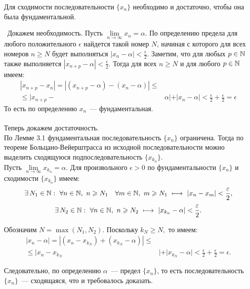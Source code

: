 \begin{theorem}
Для сходимости последовательности \(\{x_{n}\}\) необходимо и достаточно,
чтобы она была фундаментальной.

\vspace{3mm}

\proofname~Докажем необходимость.
Пусть \(\lim\limits_{n \to \infty} {x_{n}} = \alpha.\) По определению предела
для любого положительного \(\epsilon\) найдется такой номер \(N\), начиная с которого
 для всех номеров \(n \geq N\) будет выполняться \(|x_{n}-\alpha|<\frac{\epsilon}{2}.\)
Заметим, что для любых \(p \in \mathbb{N}\) также выполняется \(|x_{n+p} - \alpha| < \frac{\epsilon}{2}\).
Тогда для всех \(n \geq N\) и для любого \(p \in \mathbb{N}\) имеем:
\[
\begin{aligned}
|x_{n+p} - x_{n}| = |(x_{n+p} - \alpha) - (x_{n} - \alpha)| \leq \\
\leq |x_{n+p} - & \alpha| + |x_{n} - \alpha| < \frac{\epsilon}{2} + \frac{\epsilon}{2} = \epsilon
\end{aligned}
\]
То есть по определению \(x_{n}\)~--- фундаментальная. \\
\\

Теперь докажем достаточность.\\
\indent По Лемме 3.1 фундаментальная последовательность \(\{x_{n}\}\) ограничена. 
Тогда по теореме Больцано-Вейерштрасса из исходной последовательности
можно выделить сходящуюся подпоследовательность \(\{x_{k_{n}}\}\). \\

\indent Пусть \(\lim\limits_{n \to \infty} {x_{k_{n}}} = \alpha.\) 
Для произвольного \(\epsilon > 0\) по фундаментальности \(\{x_{n}\}\) 
и сходимости \(\{x_{k_{n}}\}\) имеем:
\[
\exists \, N_{1} \in \mathbb{N} : ~ \forall n \in \mathbb{N}, ~ n \geqslant N_{1} \hspace{1em}
\forall m \in \mathbb{N}, ~ m \geqslant N_{1} ~ \longmapsto ~ |x_{n} - x_{m}| < \frac{\varepsilon}{2},
\]
\[
\exists \, N_{2} \in \mathbb{N} : ~ \forall n \in \mathbb{N}, ~ n \geqslant N_{2}
~ \longmapsto ~ |x_{k_{n}} - \alpha| < \frac{\varepsilon}{2}.
\]

Обозначим \(N = \max(N_{1}, N_{2}).\) Поскольку \(k_{N} \geq N,\) то имеем:
\[
\begin{aligned} 
|x_{n} - \alpha| = |(x_{n} - x_{k_{N}}) + (x_{k_{N}} - \alpha)| \leq \\
\leq |x_{n} - x_{k_{N}}&| + |x_{k_{N}} - \alpha| < 
\frac{\epsilon}{2} + \frac{\epsilon}{2} = \epsilon.
\end{aligned}
\]

Следовательно, по определению \(\alpha\)~--- предел \(\{x_{n}\}\),
то есть последовательность \(\{x_{n}\}\)~--- сходящаяся, что и требовалось доказать.~\qedsymbol
\end{theorem}
